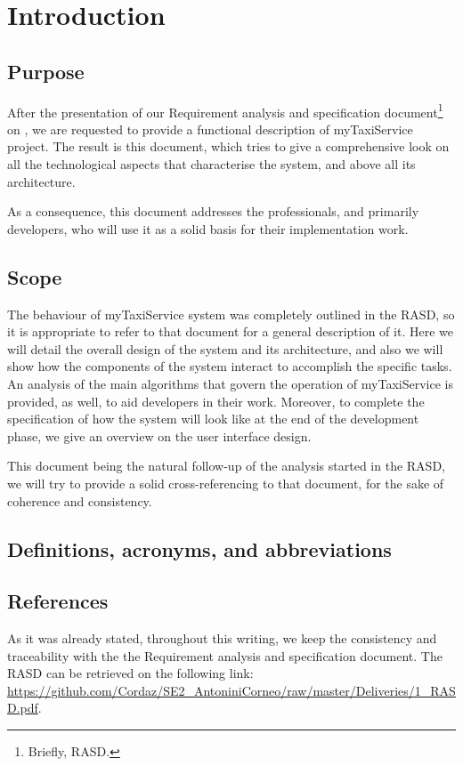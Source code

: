\chapter{Introduction} \label{chap:introduction}


\section{Purpose}
After the presentation of our Requirement analysis and specification document\footnote{Briefly, RASD.} on , we are requested to provide a functional description of myTaxiService project. The result is this document, which tries to give a comprehensive look on all the technological aspects that characterise the system, and above all its architecture.

As a consequence, this document addresses the professionals, and primarily developers, who will use it as a solid basis for their implementation work.


\section{Scope}
The behaviour of myTaxiService system was completely outlined in the RASD, so it is appropriate to refer to that document for a general description of it. Here we will detail the overall design of the system and its architecture, and also we will show how the components of the system interact to accomplish the specific tasks. An analysis of the main algorithms that govern the operation of myTaxiService is provided, as well, to aid developers in their work. Moreover, to complete the specification of how the system will look like at the end of the development phase, we give an overview on the user interface design. 

This document being the natural follow-up of the analysis started in the RASD, we will try to provide a solid cross-referencing to that document, for the sake of coherence and consistency.


\section{Definitions, acronyms, and abbreviations}
\lipsum[3]

\section{References}
As it was already stated, throughout this writing, we keep the consistency and traceability with the the Requirement analysis and specification document. The RASD can be retrieved on the following link: \url{https://github.com/Cordaz/SE2_AntoniniCorneo/raw/master/Deliveries/1_RASD.pdf}.

